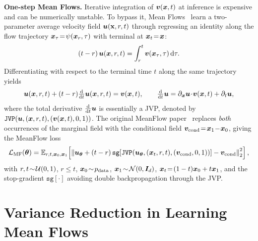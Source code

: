 \noindent\textbf{One-step Mean Flows.} Iterative integration of ${\bm{v}}({\bm{x}},t)$ at inference is expensive and can be numerically unstable. To bypass it, Mean Flows~\cite{geng2025meanflowsonestepgenerative} learn a two-parameter average velocity field ${\bm{u}}({\mathbf{x}},r,t)$ through regressing an identity along the flow trajectory ${\bm{x}}_{\tau}\!=\!\psi({\bm{x}}_{r},\tau)$ with terminal at ${\bm{x}}_{t}\!=\!{\bm{x}}$:
\begin{equation}
    (t-r)\,{\bm{u}}({\bm{x}},r,t)=\int_{r}^{t}{\bm{v}}({\bm{x}}_{\tau},\tau)\,\mathrm{d}\tau.
    \label{eq: meanflow-identity}
\end{equation}
Differentiating with respect to the terminal time $t$ along the same trajectory yields
\begin{equation}
    {\bm{u}}({\bm{x}},r,t)+(t-r)\tfrac{\mathrm{d}}{\mathrm{d}t}{\bm{u}}({\bm{x}},r,t)={\bm{v}}({\bm{x}},t),\qquad
    \tfrac{\mathrm{d}}{\mathrm{d}t}{\bm{u}}=\partial_{{\bm{x}}}{\bm{u}}\!\cdot\!{\bm{v}}({\bm{x}},t)+\partial_{t}{\bm{u}},
    \label{eq: td-meanflow-identity}
\end{equation}
where the total derivative $\frac{\mathrm{d}}{\mathrm{d}t}{\bm{u}}$ is essentially a JVP, denoted by $\texttt{JVP}({\bm{u}},({\bm{x}},r,t),({\bm{v}}({\bm{x}},t),0,1))$. The original MeanFlow paper~\cite{geng2025meanflowsonestepgenerative} replaces \emph{both} occurrences of the marginal field with the conditional field ${\bm{v}}_{\text{cond}}\!=\!{\bm{x}}_{1}\!-\!{\bm{x}}_{0}$, giving the MeanFlow loss
\begin{equation}
    \mathcal{L}_{\text{MF}}({\bm{\theta}})=
    \mathbb{E}_{r,t,{\bm{x}}_{0},{\bm{x}}_{1}}\!\left[\left\|{\bm{u}}_{{\bm{\theta}}}+(t-r)\,\texttt{sg}\!\left[\texttt{JVP}({\bm{u}}_{{\bm{\theta}}},({\bm{x}}_{t},r,t),({\bm{v}}_{\text{cond}},0,1))\right]-{\bm{v}}_{\text{cond}}\right\|_{2}^{2}\right],
    \label{eq: mf-loss}
\end{equation}
with $r,t\!\sim\!{\mathcal{U}}(0,1)$, $r\!\leq\!t$, ${\bm{x}}_{0}\!\sim\!p_{\rm{data}}$, ${\bm{x}}_{1}\!\sim\!{\mathcal{N}}(0,{\bm{I}}_{d})$, ${\bm{x}}_{t}\!=\!(1-t){\bm{x}}_{0}+t{\bm{x}}_{1}$, and the stop-gradient $\texttt{sg}[\cdot]$ avoiding double backpropagation through the JVP.

\section{Variance Reduction in Learning Mean Flows}
\label{sec: method}

